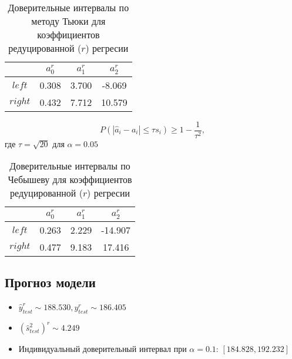\documentclass[12pt, a4paper]{article}
\begin{document}
\clearpage


\begin{table}[htb]   
	\centering 
	\begin{tabular}{| c | c | c | c |}
		\hline
		$ $ & $a_0^r$ & $a_1^r$ & $a_2^r$ \\ \hline
		$left$ & 0.308 & 3.700 & -8.069 \\ \hline
		$right$ & 0.432 & 7.712 & 10.579  \\
		\hline
	\end{tabular}
	\caption{Доверительные интервалы по методу Тьюки для коэффициентов редуцированной ($r$) регресии}
	\label{tab:conf_interval_tukey}
\end{table}


\begin{equation}
	P(|\hat{a}_i - a_i| \le \tau s_i) \ge 1 - \frac{1}{\tau^2},
	\label{eq:conf_interval_cheb}
\end{equation}
где $\tau = \sqrt{20}$ для $\alpha = 0.05$

\begin{table}[htb]   
	\centering 
	\begin{tabular}{| c | c | c | c |}
		\hline
		$ $ & $a_0^r$ & $a_1^r$ & $a_2^r$ \\ \hline
		$left$ & 0.263 & 2.229 & -14.907 \\ \hline
		$right$ & 0.477 & 9.183 & 17.416 \\
		\hline
	\end{tabular}
	\caption{Доверительные интервалы по Чебышеву для коэффициентов редуцированной ($r$) регресии}
	\label{tab:conf_interval_cheb}
\end{table}


\subsection{Прогноз модели}


\begin{itemize}
	\item $\hat{y}^r_{test} \sim 188.530, y^r_{test} \sim 186.405$
	\item $(\hat{s}_{test}^2)^r \sim 4.249$
	\item Индивидуальный доверительный интервал при $\alpha = 0.1$: $[184.828, 192.232]$
\end{itemize}
\end{document}
